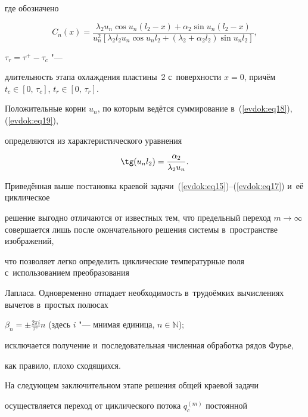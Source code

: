 где обозначено

\[

C_n (x) = \frac{\lambda _2 u_n \cos u_n (l_2 - x) + \alpha _2 \sin u_n (l_2 

- x)}{u_n^2 \left[ {\lambda _2 l_2 u_n \cos u_n l_2 + (\lambda _2 + \alpha 

_2 l_2 )\sin u_n l_2 } \right]},

\]

$\tau _r = \tau ^ + - \tau _c$ "---

длительность этапа охлаждения пластины~2 с~поверхности $x=0$, причём $t_c \in [0,\,\tau _c ]$, $t_r \in [0,\,\tau _r ]$.



Положительные корни $u_{n}$, по которым ведётся суммирование в~(\ref{evdok:eq18}), (\ref{evdok:eq19}), 

определяются из характеристического уравнения 

\begin{equation}

\label{evdok:eq20}

\tg (u_n l_2) = \frac{\alpha _2 }{\lambda _2 u_n }.

\end{equation}



Приведённая выше постановка краевой задачи~(\ref{evdok:eq15})--(\ref{evdok:eq17}) и~её циклическое 

решение выгодно отличаются от известных тем, что предельный переход $m \to 

\infty $ совершается лишь после окончательного решения системы в~пространстве изображений, 

что позволяет легко определить циклические температурные поля с~использованием преобразования 

Лапласа. Одновременно отпадает необходимость в~трудоёмких вычислениях вычетов в~простых полюсах 

$\beta _n = \pm \frac{2\pi i}{\tau ^ + }n$  (здесь $i$ "--- мнимая единица, $n \in \mathbb  N$);

исключается получение и~последовательная численная обработка рядов Фурье, 

как правило, плохо сходящихся. 





На следующем заключительном этапе решения общей краевой задачи 

осуществляется переход от циклического потока $q_c^{(m)} $ постоянной 


